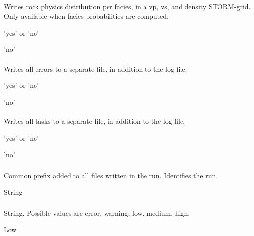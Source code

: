\paragraph{}
 \slist
   \item \Description Writes rock physics distribution per facies, in a vp, vs, and density STORM-grid. Only available when facies probabilities are computed.
   \item \Argument 'yes' or 'no'
   \item \Default 'no'
\elist

\paragraph{}
 \slist
   \item \Description Writes all errors to a separate file, in
   addition to the log file.
   \item \Argument 'yes' or 'no'
   \item \Default 'no'
\elist

\paragraph{}
 \slist
   \item \Description Writes all tasks to a separate file, in
   addition to the log file.
   \item \Argument 'yes' or 'no'
   \item \Default 'no'
\elist

\subsubsection{}
 \slist
   \item \Description Common prefix added to all files written in the run. Identifies the run.
   \item \Argument String
   \item \Default
 \elist

\subsubsection{}
 \slist
   \item \Description
   \item \Argument String. Possible values are error, warning, low, medium, high.
   \item \Default Low
 \elist

